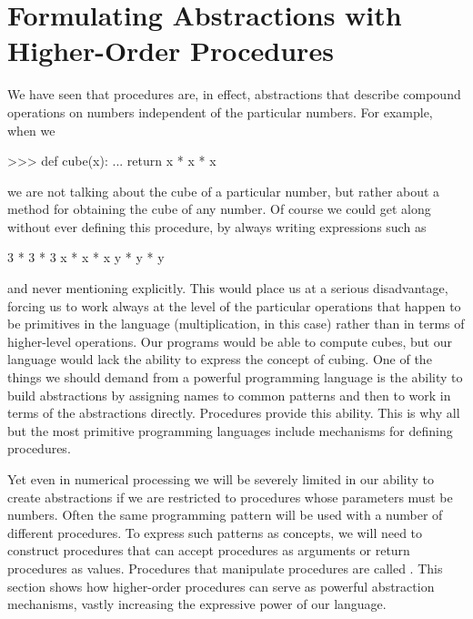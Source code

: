 \section{Formulating Abstractions with Higher-Order Procedures}
\label{Section 1.3}

We have seen that procedures are, in effect, abstractions that describe
compound operations on numbers independent of the particular numbers.  For
example, when we

\begin{codeBlock}
>>> def cube(x):
...     return x * x * x
\end{codeBlock}

\noindent
we are not talking about the cube of a particular number, but rather about a
method for obtaining the cube of any number.  Of course we could get along
without ever defining this procedure, by always writing expressions such as

\begin{syntaxForm}
3 * 3 * 3
x * x * x
y * y * y
\end{syntaxForm}

\noindent
and never mentioning  explicitly.  This would place us at a serious
disadvantage, forcing us to work always at the level of the particular
operations that happen to be primitives in the language (multiplication, in
this case) rather than in terms of higher-level operations.  Our programs would
be able to compute cubes, but our language would lack the ability to express
the concept of cubing.  One of the things we should demand from a powerful
programming language is the ability to build abstractions by assigning names to
common patterns and then to work in terms of the abstractions directly.
Procedures provide this ability.  This is why all but the most primitive
programming languages include mechanisms for defining procedures.

Yet even in numerical processing we will be severely limited in our ability to
create abstractions if we are restricted to procedures whose parameters must be
numbers.  Often the same programming pattern will be used with a number of
different procedures.  To express such patterns as concepts, we will need to
construct procedures that can accept procedures as arguments or return
procedures as values.  Procedures that manipulate procedures are called
.  This section shows how higher-order
procedures can serve as powerful abstraction mechanisms, vastly increasing the
expressive power of our language.



